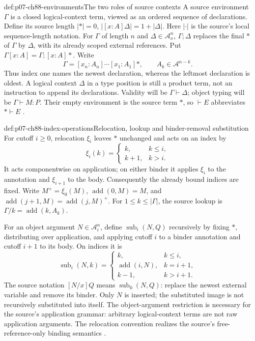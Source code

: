 \begin{hbdefinition}{def:p07-ch88-environments}{The two roles of source contexts}
A source environment \(\Gamma\) is a closed logical-context term,
viewed as an ordered sequence of declarations. Define its source length
\(|\ast|=0\), \(|[x:A]\Delta|=1+|\Delta|\).
Here \(|\cdot|\) is the source's local sequence-length notation.
For \(\Gamma\) of length \(n\) and \(\Delta\in\mathcal A_o^n\),
\(\Gamma;\Delta\) replaces the final \(\ast\) of \(\Gamma\)
by \(\Delta\), with its already scoped external references. Put
\(\Gamma[x:A]=\Gamma;[x:A]\ast\).
Write
\[
 \Gamma=[x_n:A_n]\cdots[x_1:A_1]\ast,
 \qquad A_k\in\mathcal A^{n-k}.
\]
Thus index one names the newest declaration, whereas the leftmost
declaration is oldest. A logical context \(\Delta\) in a type position
is still a product term, not an instruction to append its declarations.
Validity will be \(\Gamma\vdash\Delta\); object typing will be
\(\Gamma\vdash M:P\). Their empty environment is the source term
\(\ast\), so \(\vdash E\) abbreviates \(\ast\vdash E\)
\cite[pp.~97--99]{CoquandHuet1988}.
\end{hbdefinition}

\begin{hbdefinition}{def:p07-ch88-index-operations}{Relocation, lookup and binder-removal substitution}
For cutoff \(i\geq0\), relocation \(\xi_i\) leaves \(\ast\)
unchanged and acts on an index by
\[
 \xi_i(k)=\begin{cases}k,&k\leq i,\\k+1,&k>i.\end{cases}
\]
It acts componentwise on application; on either binder it applies
\(\xi_i\) to the annotation and \(\xi_{i+1}\) to the body.
Consequently the already bound indices are fixed. Write
\(M^+=\xi_0(M)\), \(\operatorname{add}(0,M)=M\), and
\(\operatorname{add}(j+1,M)=\operatorname{add}(j,M)^+\).
For \(1\leq k\leq|\Gamma|\), the source lookup is
\(\Gamma/k=\operatorname{add}(k,A_k)\).

For an object argument \(N\in\mathcal A_i^n\), define
\(\operatorname{sub}_i(N,Q)\) recursively by fixing \(\ast\),
distributing over application, and applying cutoff \(i\) to a binder
annotation and cutoff \(i+1\) to its body. On indices it is
\[
 \operatorname{sub}_i(N,k)=
 \begin{cases}
 k,&k\leq i,\\
 \operatorname{add}(i,N),&k=i+1,\\
 k-1,&k>i+1.
 \end{cases}
\]
The source notation \([N/x]Q\) means
\(\operatorname{sub}_0(N,Q)\): replace the newest external variable
and remove its binder. Only \(N\) is inserted; the substituted image
is not recursively substituted into itself. The object-argument restriction
is necessary for the source's application grammar: arbitrary logical-context
terms are not raw application arguments. The relocation convention realizes
the source's free-reference-only binding semantics
\cite[pp.~98--99]{CoquandHuet1988}.
\end{hbdefinition}

